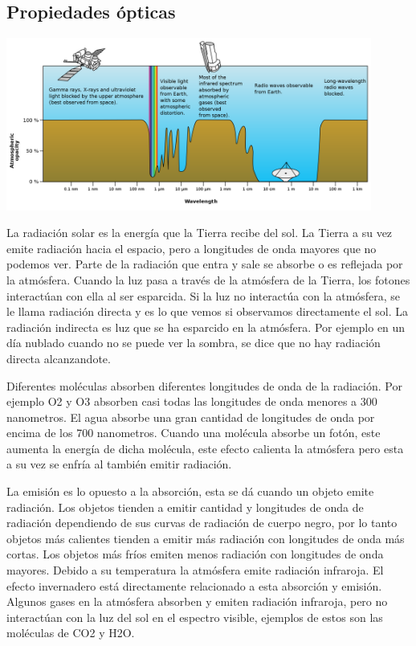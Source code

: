 \documentclass{article} %
\begin{document}
\subsection{Propiedades ópticas}

\vspace{0.5 cm}

\begin{center}

\includegraphics[width=12cm]{Atmospheric_electromagnetic_opacity_svg.png}    
    
\end{center}

La radiación solar es la energía que la Tierra recibe del sol. La Tierra a su vez emite radiación hacia el espacio, pero a longitudes de onda mayores que no podemos ver. Parte de la radiación que entra y sale se absorbe o es reflejada por la atmósfera. Cuando la luz pasa a través de la atmósfera de la Tierra, los fotones interactúan con ella al ser esparcida. Si la luz no interactúa con la atmósfera, se le llama radiación directa y es lo que vemos si observamos directamente el sol. La radiación indirecta es luz que se ha esparcido en la atmósfera. Por ejemplo en un día nublado cuando no se puede ver la sombra, se dice que no hay radiación directa alcanzandote. 
\vspace{0.5 cm}

Diferentes moléculas absorben diferentes longitudes de onda de la radiación. Por ejemplo O2 y O3 absorben casi todas las longitudes de onda menores a 300 nanometros. El agua absorbe una gran cantidad de longitudes de onda por encima de los 700 nanometros. Cuando una molécula absorbe un fotón, este aumenta la energía de dicha molécula, este efecto calienta la atmósfera pero esta a su vez se enfría al también emitir radiación. 
\vspace{0.5 cm}

La emisión es lo opuesto a la absorción, esta se dá cuando un objeto emite radiación. Los objetos tienden a emitir cantidad y longitudes de onda de radiación dependiendo de sus curvas de radiación de cuerpo negro, por lo tanto objetos más calientes tienden a emitir más radiación con longitudes de onda más cortas. Los objetos más fríos emiten menos radiación con longitudes de onda mayores. Debido a su temperatura la atmósfera emite radiación infraroja. El efecto invernadero está directamente relacionado a esta absorción y emisión. Algunos gases en la atmósfera absorben y emiten radiación infraroja, pero no interactúan con la luz del sol en el espectro visible, ejemplos de estos son las moléculas de CO2 y H2O.
\vspace{0.5 cm}
\end{document}
